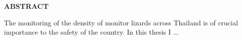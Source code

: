 {}

\begin{center}
    \large{\bf ABSTRACT}
\end{center}

The monitoring of the density of monitor lizards across Thailand is of crucial importance to the safety of the country. In this thesis I ...
